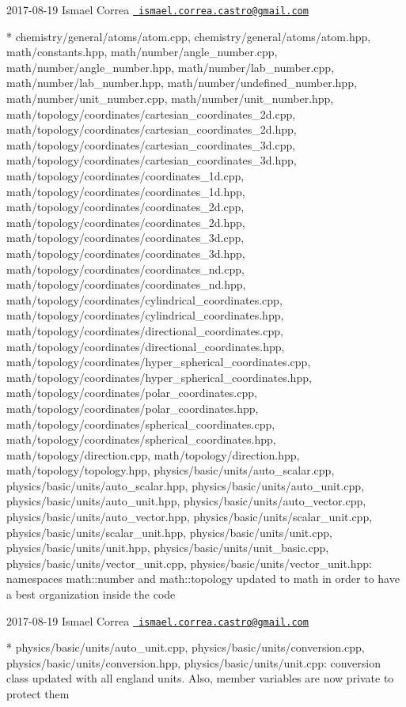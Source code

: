  2017-\/08-\/19 Ismael Correa \href{mailto:ismael.correa.castro@gmail.com}{\texttt{ ismael.\+correa.\+castro@gmail.\+com}} \begin{DoxyVerb}* chemistry/general/atoms/atom.cpp,
chemistry/general/atoms/atom.hpp, math/constants.hpp,
math/number/angle_number.cpp, math/number/angle_number.hpp,
math/number/lab_number.cpp, math/number/lab_number.hpp,
math/number/undefined_number.hpp, math/number/unit_number.cpp,
math/number/unit_number.hpp,
math/topology/coordinates/cartesian_coordinates_2d.cpp,
math/topology/coordinates/cartesian_coordinates_2d.hpp,
math/topology/coordinates/cartesian_coordinates_3d.cpp,
math/topology/coordinates/cartesian_coordinates_3d.hpp,
math/topology/coordinates/coordinates_1d.cpp,
math/topology/coordinates/coordinates_1d.hpp,
math/topology/coordinates/coordinates_2d.cpp,
math/topology/coordinates/coordinates_2d.hpp,
math/topology/coordinates/coordinates_3d.cpp,
math/topology/coordinates/coordinates_3d.hpp,
math/topology/coordinates/coordinates_nd.cpp,
math/topology/coordinates/coordinates_nd.hpp,
math/topology/coordinates/cylindrical_coordinates.cpp,
math/topology/coordinates/cylindrical_coordinates.hpp,
math/topology/coordinates/directional_coordinates.cpp,
math/topology/coordinates/directional_coordinates.hpp,
math/topology/coordinates/hyper_spherical_coordinates.cpp,
math/topology/coordinates/hyper_spherical_coordinates.hpp,
math/topology/coordinates/polar_coordinates.cpp,
math/topology/coordinates/polar_coordinates.hpp,
math/topology/coordinates/spherical_coordinates.cpp,
math/topology/coordinates/spherical_coordinates.hpp,
math/topology/direction.cpp, math/topology/direction.hpp,
math/topology/topology.hpp, physics/basic/units/auto_scalar.cpp,
physics/basic/units/auto_scalar.hpp,
physics/basic/units/auto_unit.cpp,
physics/basic/units/auto_unit.hpp,
physics/basic/units/auto_vector.cpp,
physics/basic/units/auto_vector.hpp,
physics/basic/units/scalar_unit.cpp,
physics/basic/units/scalar_unit.hpp, physics/basic/units/unit.cpp,
physics/basic/units/unit.hpp, physics/basic/units/unit_basic.cpp,
physics/basic/units/vector_unit.cpp,
physics/basic/units/vector_unit.hpp: namespaces math::number and
math::topology updated to math in order to have a best organization
inside the code
\end{DoxyVerb}
 2017-\/08-\/19 Ismael Correa \href{mailto:ismael.correa.castro@gmail.com}{\texttt{ ismael.\+correa.\+castro@gmail.\+com}} \begin{DoxyVerb}* physics/basic/units/auto_unit.cpp,
physics/basic/units/conversion.cpp,
physics/basic/units/conversion.hpp, physics/basic/units/unit.cpp: 
conversion class updated with all england units. Also, member
variables are now private to protect them
\end{DoxyVerb}
